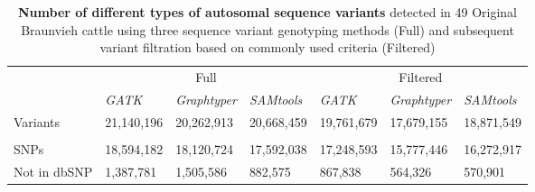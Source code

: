 \documentclass[../main.tex]{subfiles}
\begin{document}
\begin{landscape}
\begin{table}
    \vspace{10mm} 
    \centering
    \caption[Number of different types of autosomal sequence variants]{\textbf{Number of different types of autosomal sequence variants} detected in 49 Original Braunvieh cattle using three sequence variant genotyping methods (Full) and subsequent variant filtration based on commonly used criteria (Filtered)}
    \vspace{10mm}
    \begin{tabular}{|l|l|l|l|l|l|l|} 
    \cline{2-7}
    \multicolumn{1}{l|}{} & \multicolumn{3}{c|}{\multirow{2}{*}{Full}}                                      & \multicolumn{3}{c|}{\multirow{2}{*}{Filtered}}                                   \\
    \multicolumn{1}{l|}{} & \multicolumn{3}{l|}{}                                                           & \multicolumn{3}{l|}{}                                                            \\ 
    \cline{2-7}
    \multicolumn{1}{l|}{} & \multirow{2}{*}{\emph{GATK}} & \multirow{2}{*}{\emph{Graphtyper}} & \multirow{2}{*}{\emph{SAMtools}} & \multirow{2}{*}{\emph{GATK}} & \multirow{2}{*}{\emph{Graphtyper}} & \multirow{2}{*}{\emph{SAMtools}}  \\ 
    \cline{1-1}
                          &                       &                             &                           &                       &                             &                            \\ 
    \hline
    Variants              & 21,140,196            & 20,262,913                  & 20,668,459                & 19,761,679            & 17,679,155                  & 18,871,549                 \\ 
    \hline
    \multicolumn{7}{|l|}{}                                                                                                                                                                     \\ 
    \hline
    SNPs                  & 18,594,182            & 18,120,724                  & 17,592,038                & 17,248,593            & 15,777,446                  & 16,272,917                 \\ 
    \hline
    Not in dbSNP          & 1,387,781             & 1,505,586                   & 882,575                   & 867,838               & 564,326                     & 570,901                    \\ 

\end{tabular}
\end{table}
\end{landscape}
\end{document}
